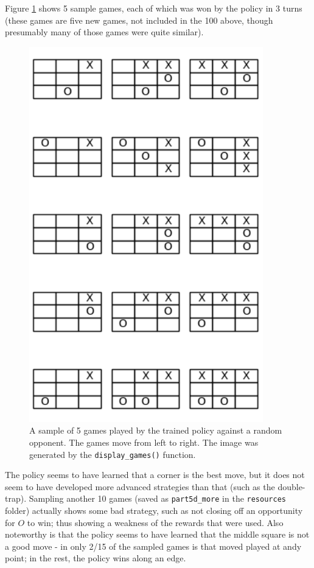 \documentclass{article}
\begin{document}
   Figure \ref{fig:5d} shows 5 sample games, each of which was won by the policy in 3 turns (these games are
   five new games, not included in the 100 above, though presumably many of those games were quite similar).
      \begin{figure}[h] \centering
          \includegraphics[width=4in]{resources/part5d}
          \caption{ A sample of 5 games played by the trained policy against a random opponent. The games
                  move from left to right. The image was generated by the \texttt{display\_games()} function. }
          \label{fig:5d}
       \end{figure}
   The policy seems to have learned that a corner is the best move, but it does not seem to have developed more
   advanced strategies than that (such as the double-trap). Sampling another 10 games (saved as \texttt{part5d\_more}
   in the \texttt{resources} folder) actually shows some bad strategy, such as not closing off an opportunity for
   $O$ to win; thus showing a weakness of the rewards that were used. Also noteworthy is that the policy seems to
   have learned that the middle square is not a good move - in only 2/15 of the sampled games is that moved played at
   andy point; in the rest, the policy wins along an edge.
\end{document}
